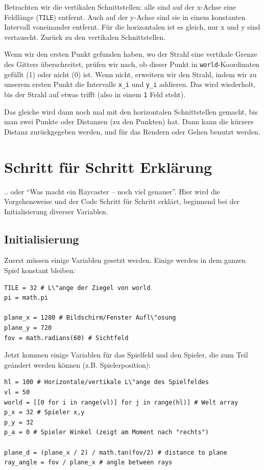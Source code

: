 \documentclass[a4paper,12pt]{report}
\begin{document}
Betrachten wir die vertikalen Schnittstellen: alle sind auf der x-Achse eine Feldl\"ange (\texttt{TILE}) entfernt. Auch auf der y-Achse sind sie in einem konstanten Intervall voneinander entfernt. F\"ur die horizontalen ist es gleich, nur x und y sind vertauscht. Zur\"uck zu den vertikalen Schnittstellen.

Wenn wir den ersten Punkt gefunden haben, wo der Strahl eine vertikale Grenze des Gitters \"uberschreitet, pr\"ufen wir nach, ob dieser Punkt in \texttt{world}-Koordinaten gef\"ullt (1) oder nicht (0) ist. Wenn nicht, erweitern wir den Strahl, indem wir zu unserem ersten Punkt die Intervalle \texttt{x\_i} und \texttt{y\_i} addieren. Das wird wiederholt, bis der Strahl auf etwas trifft (also in einem \texttt{1} Feld steht).

Das gleiche wird dann noch mal mit den horizontalen Schnittstellen gemacht, bis man zwei Punkte oder Distanzen (zu den Punkten) hat. Dann kann die k\"urzere Distanz zur\"uckgegeben werden, und f\"ur das Rendern oder Gehen benutzt werden.

\section{Schritt f\"ur Schritt Erkl\"arung}

.. oder ``Was macht ein Raycaster -- noch viel genauer''. Hier wird die Vorgehensweise und der Code Schritt f\"ur Schritt erkl\"art, beginnend bei der Initialisierung diverser Variablen.

\subsection{Initialisierung}

Zuerst m\"ussen einige Variablen gesetzt werden. Einige werden in dem ganzen Spiel konstant bleiben:
\begin{Verbatim}[baselinestretch=1.0, xleftmargin=1cm]
TILE = 32 # L\"ange der Ziegel von world
pi = math.pi

plane_x = 1280 # Bildschirm/Fenster Aufl\"osung
plane_y = 720
fov = math.radians(60) # Sichtfeld
\end{Verbatim}

Jetzt kommen einige Variablen f\"ur das Spielfeld und den Spieler, die zum Teil ge\"andert werden k\"onnen (z.B. Spielerposition):
\begin{Verbatim}[baselinestretch=1.0, xleftmargin=1cm]
hl = 100 # Horizontale/vertikale L\"ange des Spielfeldes
vl = 50
world = [[0 for i in range(vl)] for j in range(hl)] # Welt array
p_x = 32 # Spieler x,y
p_y = 32
p_a = 0 # Spieler Winkel (zeigt am Moment nach "rechts")

plane_d = (plane_x / 2) / math.tan(fov/2) # distance to plane
ray_angle = fov / plane_x # angle between rays
\end{Verbatim}
\end{document}
